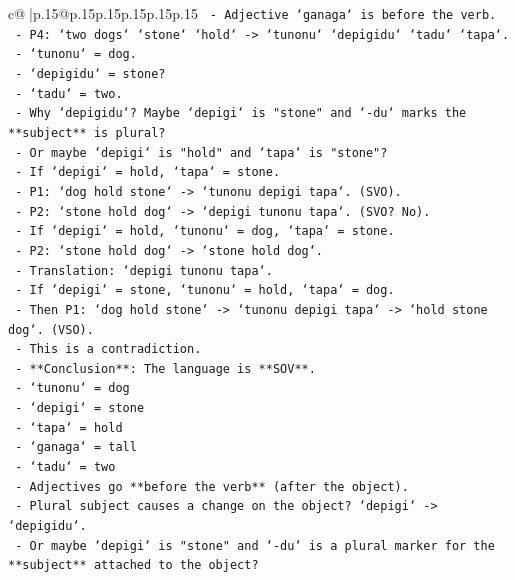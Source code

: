 \documentclass{article}
\begin{document}
{\begin{supertabular}{c@{$\;$}|p{.15\linewidth}@{}p{.15\linewidth}p{.15\linewidth}p{.15\linewidth}p{.15\linewidth}p{.15\linewidth}}
{{{\texttt{           {-} Adjective `ganaga` is before the verb.} \\
\texttt{         {-} P4: `two dogs` `stone` `hold` {-}> `tunonu` `depigidu` `tadu` `tapa`.} \\
\texttt{           {-} `tunonu` = dog.} \\
\texttt{           {-} `depigidu` = stone?} \\
\texttt{           {-} `tadu` = two.} \\
\texttt{           {-} Why `depigidu`? Maybe `depigi` is "stone" and `{-}du` marks the **subject** is plural?} \\
\texttt{           {-} Or maybe `depigi` is "hold" and `tapa` is "stone"?} \\
\texttt{             {-} If `depigi` = hold, `tapa` = stone.} \\
\texttt{             {-} P1: `dog hold stone` {-}> `tunonu depigi tapa`. (SVO).} \\
\texttt{             {-} P2: `stone hold dog` {-}> `depigi tunonu tapa`. (SVO? No).} \\
\texttt{             {-} If `depigi` = hold, `tunonu` = dog, `tapa` = stone.} \\
\texttt{             {-} P2: `stone hold dog` {-}> `stone hold dog`.} \\
\texttt{             {-} Translation: `depigi tunonu tapa`.} \\
\texttt{             {-} If `depigi` = stone, `tunonu` = hold, `tapa` = dog.} \\
\texttt{             {-} Then P1: `dog hold stone` {-}> `tunonu depigi tapa` {-}> `hold stone dog`. (VSO).} \\
\texttt{             {-} This is a contradiction.} \\
\texttt{     {-} **Conclusion**: The language is **SOV**.} \\
\texttt{       {-} `tunonu` = dog} \\
\texttt{       {-} `depigi` = stone} \\
\texttt{       {-} `tapa` = hold} \\
\texttt{       {-} `ganaga` = tall} \\
\texttt{       {-} `tadu` = two} \\
\texttt{       {-} Adjectives go **before the verb** (after the object).} \\
\texttt{       {-} Plural subject causes a change on the object? `depigi` {-}> `depigidu`.} \\
\texttt{       {-} Or maybe `depigi` is "stone" and `{-}du` is a plural marker for the **subject** attached to the object?} \\
}}}
\end{supertabular}}
\end{document}
